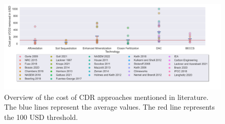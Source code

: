 \begin{figure}
\captionsetup{margin=3.5cm}
    \centering
    \includegraphics[width=600pt]{figures/cost.png}
    \caption{Overview of the cost of CDR approaches mentioned in literature. The blue lines represent the average values. The red line represents the 100 USD threshold.}
    \label{fig:awesome_image}
\end{figure}

\nocite{House2011EconomicAir, Aumont2006GlobalizingStudies, Buesseler2008OceanUncertainty, Cao2010ImportanceChange, Oschlies2010ClimateApprentice, Beringer2011BioenergyConstraints, Rogner2012EnergyPotentials, Krey2014GlobalReview, Cornelissen2012TheSystem}
\nocite{Cornelissen2012TheSystem, Mazzotti2013DirectContactor, Socolow2011DirectAffairs, Zeman2014ReducingCO2, Nemet2011WillingnessCapture, Kulkarni2012AnalysisAir, Stolaroff2008CarbonSpray}
\nocite{McKinsey2020ClimateTake, Liu2023Monitoring2022}